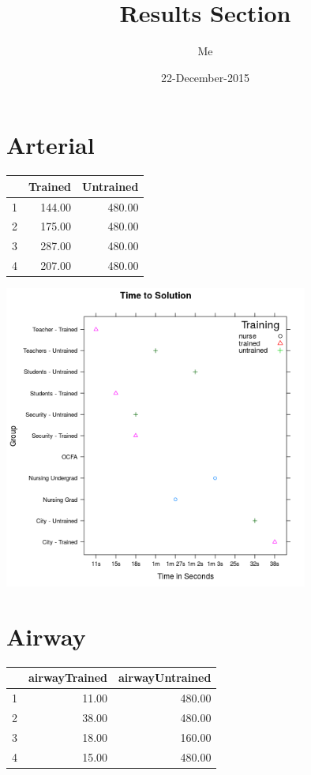 \documentclass{article}
\title{Results Section}
\author{Me}
\date{22-December-2015}
\begin{document}
\maketitle
\graphicspath{ {../Plots/} }

\section{Arterial}
\begin{table}[ht]
\centering
\begin{tabular}{rrr}
  \hline
 & Trained & Untrained \\ 
  \hline
1 & 144.00 & 480.00 \\ 
  2 & 175.00 & 480.00 \\ 
  3 & 287.00 & 480.00 \\ 
  4 & 207.00 & 480.00 \\ 
   \hline
\end{tabular}
\end{table}

\includegraphics[width = 10cm]{Arterial_Time.png}

\section{Airway}
\begin{table}[ht]
\centering
\begin{tabular}{rrr}
  \hline
 & airwayTrained & airwayUntrained \\ 
  \hline
1 & 11.00 & 480.00 \\ 
  2 & 38.00 & 480.00 \\ 
  3 & 18.00 & 160.00 \\ 
  4 & 15.00 & 480.00 \\ 
   \hline
\end{tabular}
\end{table}
\end{document}
